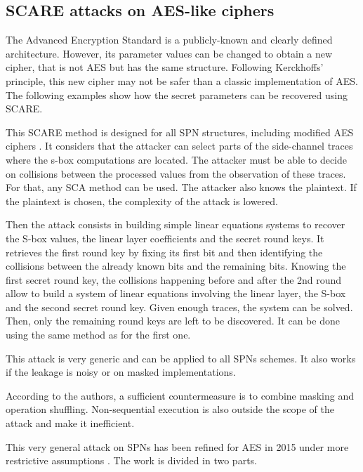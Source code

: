 \documentclass[11pt]{sdm}
\begin{document}

\subsection{SCARE attacks on AES-like ciphers}

The Advanced Encryption Standard is a publicly-known and clearly defined architecture. 
However, its parameter values can be changed to obtain a new cipher, that is not AES but has the same structure.
Following Kerckhoffs' principle, this new cipher may not be safer than a classic implementation of AES.
The following examples show how the secret parameters can be recovered using SCARE.

This SCARE method is designed for all SPN structures, including modified AES ciphers \parencite{Rivain_Roche_2013}.
It considers that the attacker can select parts of the side-channel traces where the s-box computations are located.
The attacker must be able to decide on collisions between the processed values from the observation of these traces.
For that, any SCA method can be used.
The attacker also knows the plaintext. If the plaintext is chosen, the complexity of the attack is lowered.

Then the attack consists in building simple linear equations systems to recover the S-box values, the linear layer coefficients and the secret round keys.
It retrieves the first round key by fixing its first bit and then identifying the collisions between the already known bits and the remaining bits.
Knowing the first secret round key, the collisions happening before and after the 2nd round allow to build a system of linear equations involving the linear layer, the S-box and the second secret round key.
Given enough traces, the system can be solved.
Then, only the remaining round keys are left to be discovered.
It can be done using the same method as for the first one.

This attack is very generic and can be applied to all SPNs schemes.
It also works if the leakage is noisy or on masked implementations.

According to the authors, a sufficient countermeasure is to combine masking and operation shuffling.
Non-sequential execution is also outside the scope of the attack and make it inefficient.

\smallbreak
This very general attack on SPNs has been refined for AES in 2015 under more restrictive assumptions \parencite{Clavier_Isorez_Marion_Wurcker_2015}.
The work is divided in two parts.
\end{document}
